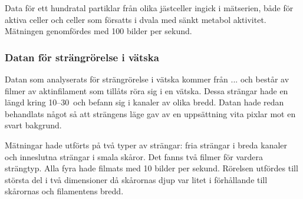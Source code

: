 Data för ett hundratal partiklar från olika jästceller ingick i mätserien, både för aktiva celler och celler som försatts i dvala med sänkt metabol aktivitet. Mätningen genomfördes med 100 bilder per sekund.


\subsubsection{Datan för strängrörelse i vätska}

Datan som analyserats för strängrörelse i vätska kommer från ... och består av filmer av aktinfilament som tillåts röra sig i en vätska. Dessa strängar hade en längd kring 10--30\, och befann sig i kanaler av olika bredd. Datan hade redan behandlats något så att strängens läge gav av en uppsättning vita pixlar mot en svart bakgrund.

Mätningar hade utförts på två typer av strängar: fria strängar i breda kanaler och inneslutna strängar i smala skåror. Det fanns två filmer för vardera strängtyp. Alla fyra hade filmats med 10 bilder per sekund. Rörelsen utfördes till största del i två dimensioner då skårornas djup var litet i förhållande till skårornas och filamentens bredd.












